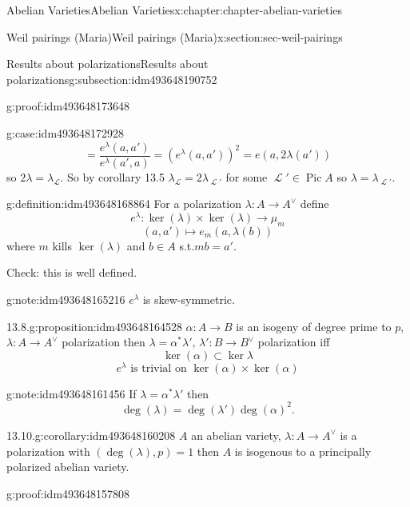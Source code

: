 \documentclass[oneside,10pt,]{book}
\numberwithin{equation}{section}
\newcommand{\sheaf}[1]{\operatorname{\mathcal{#1}}}
\DeclareMathOperator{\Pic}{Pic}
\begin{document}
\begin{chapterptx}{Abelian Varieties}{}{Abelian Varieties}{}{}{x:chapter:chapter-abelian-varieties}
\begin{sectionptx}{Weil pairings (Maria)}{}{Weil pairings (Maria)}{}{}{x:section:sec-weil-pairings}
\begin{subsectionptx}{Results about polarizations}{}{Results about polarizations}{}{}{g:subsection:idm493648190752}
\begin{proofptx}{}{g:proof:idm493648173648}
\begin{case}{}{}{g:case:idm493648172928}
\begin{equation*}
= \frac{e^\lambda(a,a')}{ e^\lambda(a',a)} = (e^\lambda(a,a'))^2 = e(a,2\lambda (a'))
\end{equation*}
so \(2\lambda = \lambda_{\sheaf L}\). So by corollary 13.5 \(\lambda_{\sheaf L} = 2\lambda_{\sheaf L'}\) for some \(\sheaf L' \in \Pic A\) so \(\lambda = \lambda_{\sheaf L'}\).%
\end{case}
\end{proofptx}
\begin{definition}{}{g:definition:idm493648168864}%
For a  polarization \(\lambda \colon A\to A^\vee\) define%
\begin{equation*}
e^{\lambda} \colon \ker(\lambda)\times \ker(\lambda) \to \mu_m
\end{equation*}
%
\begin{equation*}
(a,a')\mapsto e_m(a,\lambda(b))
\end{equation*}
where \(m \) kills \(\ker(\lambda)\) and \(b \in A\) s.t.\(mb = a'\).%
\end{definition}
Check: this is well defined.%
\begin{note}{}{g:note:idm493648165216}%
\(e^\lambda\) is skew-symmetric.%
\end{note}
\begin{proposition}{13.8.}{}{g:proposition:idm493648164528}%
\(\alpha\colon A \to B\) is an isogeny of degree prime to \(p\), \(\lambda\colon A\to A^\vee\) polarization then \(\lambda = \alpha^* \lambda', \,\lambda' \colon B\to B^\vee\) polarization iff%
\begin{equation*}
\ker(\alpha) \subset \ker \lambda
\end{equation*}
%
\begin{equation*}
e^{\lambda} \text{ is trivial on } \ker (\alpha)\times \ker(\alpha)
\end{equation*}
%
\end{proposition}
\begin{note}{}{g:note:idm493648161456}%
If \(\lambda = \alpha^* \lambda'\) then%
\begin{equation*}
\deg(\lambda) = \deg (\lambda') \deg(\alpha)^2\text{.}
\end{equation*}
%
\end{note}
\begin{corollary}{13.10.}{}{g:corollary:idm493648160208}%
\(A\) an abelian variety, \(\lambda \colon A \to A^\vee\) is a polarization with \((\deg (\lambda), p) = 1\) then \(A\) is  isogenous to a principally polarized abelian variety.%
\end{corollary}
\begin{proofptx}{}{g:proof:idm493648157808}

\end{proofptx}
\end{subsectionptx}
\end{sectionptx}
\end{chapterptx}
\end{document}
